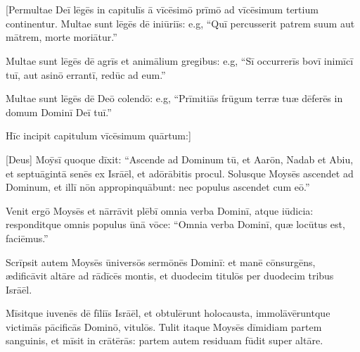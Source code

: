 \chapter{}


\vspace*{-1.4cm}
\thispagestyle{empty}

[Permultae Deī lēgēs in capitulīs ā vīcēsimō prīmō ad vīcēsimum tertium
continentur. Multae sunt lēgēs dē iniūriīs: e.g, ``Quī percusserit patrem
suum aut mātrem, morte moriātur.''

Multae sunt lēgēs dē agrīs et animālium
gregibus: e.g, ``Sī occurrerīs bovī inimīcī tuī, aut asinō errantī, redūc
ad eum.''

Multae sunt lēgēs dē Deō colendō: e.g, ``Prīmitiās frūgum terræ
tuæ dēferēs in domum Dominī Deī tuī.''

Hīc incipit
capitulum vīcēsimum quārtum:]

[Deus] Moȳsī quoque dīxit: ``Ascende ad Dominum
tū, et Aarōn, Nadab et Abiu, et septuāgintā senēs ex
Isrāēl, et adōrābitis procul.
Solusque
Moysēs ascendet ad Dominum, et illī nōn appropinquābunt:
nec populus ascendet cum eō.''

Venit ergō Moysēs et nārrāvit
plēbī omnia verba Dominī, atque
iūdicia:
responditque omnis populus ūnā vōce: ``Omnia verba Dominī, quæ locūtus est,
faciēmus.''

Scrīpsit autem Moysēs ūniversōs sermōnēs Dominī: et manē
cōnsurgēns, ædificāvit altāre ad
rādīcēs montis,
et duodecim titulōs per duodecim tribus
Isrāēl. 

Mīsitque iuvenēs dē fīliīs Isrāēl, et obtulērunt
holocausta,
immolāvēruntque victimās pācificās Dominō, vitulōs.  
Tulit itaque Moysēs
dīmidiam partem sanguinis, et mīsit in crātērās: partem
autem residuam fūdit super altāre. 

